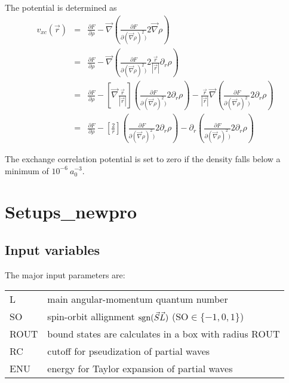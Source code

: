 \documentclass[11pt,a4paper]{report}
\begin{document}
The potential is determined as
\begin{eqnarray*}
v_{xc}(\vec{r})
&=& \frac{\partial F}{\partial\rho}
-\vec{\nabla}\left(\frac{\partial F}{\partial(\vec{\nabla}\rho)^2)}2\vec{\nabla}\rho\right)
\\
&=& \frac{\partial F}{\partial\rho}
- \vec{\nabla}\left(\frac{\partial F}{\partial(\vec{\nabla}\rho)^2)}
2\frac{\vec{r}}{|\vec{r}|}\partial_r\rho\right)
\\
&=& \frac{\partial F}{\partial\rho}
- \left[\vec{\nabla}\frac{\vec{r}}{|\vec{r}|}\right]
\left(\frac{\partial F}{\partial(\vec{\nabla}\rho)^2)}
2\partial_r\rho\right)
- \frac{\vec{r}}{|\vec{r}|}\vec{\nabla}
\left(\frac{\partial F}{\partial(\vec{\nabla}\rho)^2)}
2\partial_r\rho\right)
\\
&=& \frac{\partial F}{\partial\rho}
- \left[\frac{2}{r}\right]
\left(\frac{\partial F}{\partial(\vec{\nabla}\rho)^2)}
2\partial_r\rho\right)
- \partial_r
\left(\frac{\partial F}{\partial(\vec{\nabla}\rho)^2)}
2\partial_r\rho\right)
\end{eqnarray*}

The exchange correlation potential is set to zero if the density falls
below a minimum of $10^{-6}~a_0^{-3}$.



\section{Setups\_newpro}
\subsection{Input variables}
The major input parameters are:
\begin{center}
\begin{tabular}{|l|l|}
\hline
L    & main angular-momentum quantum number\\
SO   & spin-orbit allignment ${\rm sgn}(\vec{S}\vec{L})$ (SO$\in\{-1,0,1\}$)\\
ROUT & bound states are calculates in a box with radius ROUT\\
RC   & cutoff for pseudization of partial waves\\
ENU  & energy for Taylor expansion of partial waves\\
\hline
\end{tabular}
\end{center}
\end{document}
